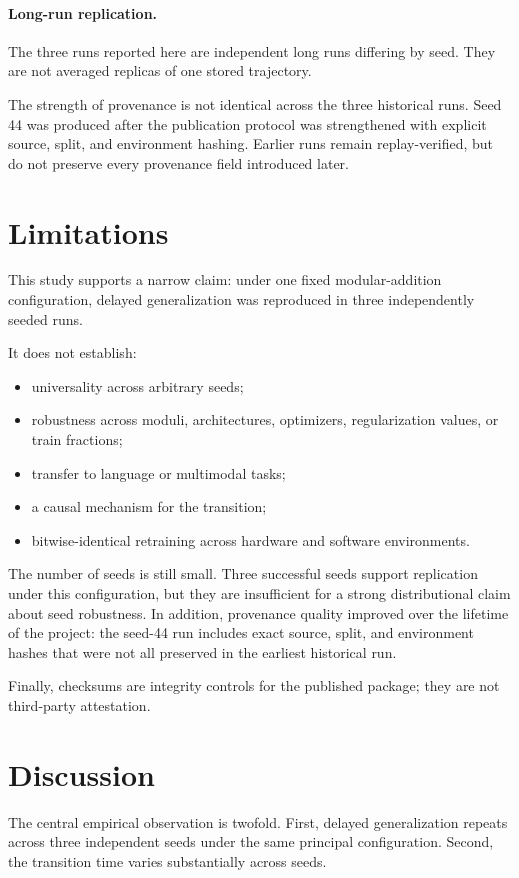 \documentclass[11pt]{article}
\begin{document}
\paragraph{Long-run replication.}
The three runs reported here are independent long runs differing by seed. They are not averaged replicas of one stored trajectory.

The strength of provenance is not identical across the three historical runs. Seed 44 was produced after the publication protocol was strengthened with explicit source, split, and environment hashing. Earlier runs remain replay-verified, but do not preserve every provenance field introduced later.

\section{Limitations}
This study supports a narrow claim: under one fixed modular-addition configuration, delayed generalization was reproduced in three independently seeded runs.

It does not establish:
\begin{itemize}[leftmargin=*]
    \item universality across arbitrary seeds;
    \item robustness across moduli, architectures, optimizers, regularization values, or train fractions;
    \item transfer to language or multimodal tasks;
    \item a causal mechanism for the transition;
    \item bitwise-identical retraining across hardware and software environments.
\end{itemize}

The number of seeds is still small. Three successful seeds support replication under this configuration, but they are insufficient for a strong distributional claim about seed robustness. In addition, provenance quality improved over the lifetime of the project: the seed-44 run includes exact source, split, and environment hashes that were not all preserved in the earliest historical run.

Finally, checksums are integrity controls for the published package; they are not third-party attestation.

\section{Discussion}
The central empirical observation is twofold. First, delayed generalization repeats across three independent seeds under the same principal configuration. Second, the transition time varies substantially across seeds.
\end{document}
